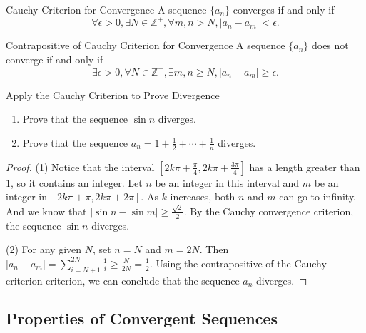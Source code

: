\begin{theorem}{Cauchy Criterion for Convergence}{}
  A sequence $\{a_n\}$ converges if and only if
  \begin{equation}
    \forall \epsilon > 0, \exists N \in \mathbb{Z}^+, \forall m,n > N, |a_n - a_m| < \epsilon.
  \end{equation}
\end{theorem}

\begin{corollary}{Contrapositive of Cauchy Criterion for Convergence}{}
  A sequence $\{a_n\}$ does not converge if and only if
  \begin{equation}
    \exists \epsilon > 0, \forall N \in \mathbb{Z}^+, \exists m, n \geq N, |a_n - a_m| \geq \epsilon.
  \end{equation}
\end{corollary}

\begin{example}{Apply the Cauchy Criterion to Prove Divergence}{}
  \begin{enumerate}
  \item Prove that the sequence $\sin n$ diverges.
  \item Prove that the sequence $a_n = 1 + \frac{1}{2} + \cdots + \frac{1}{n}$ diverges.
  \end{enumerate}
\end{example}

\begin{proof}
  (1) Notice that the interval $[2k\pi + \frac{\pi}{4}, 2k\pi + \frac{3\pi}{4}]$
  has a length greater than $1$, so it contains an integer.
  Let $n$ be an integer in this interval
  and $m$ be an integer in $[2k\pi + \pi, 2k\pi + 2\pi]$.
  As $k$ increases, both $n$ and $m$ can go to infinity.
  And we know that $|\sin n - \sin m| \geq \frac{\sqrt{2}}{2}$.
  By the Cauchy convergence criterion, the sequence $\sin n$ diverges.

  (2) For any given $N$, set $n = N$ and $m = 2N$.
  Then $|a_n - a_m| = \sum\limits_{i = N + 1}^{2N} \frac{1}{i} \geq \frac{N}{2N}
  = \frac{1}{2}$.
  Using the contrapositive of the Cauchy criterion criterion,
  we can conclude that the sequence $a_n$ diverges.
\end{proof}

\subsection{Properties of Convergent Sequences}

